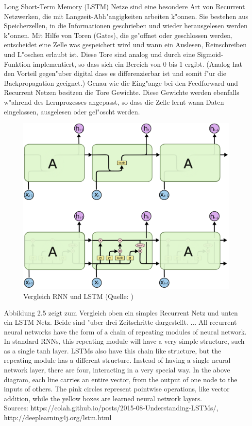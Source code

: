 {Long Short-Term Memory (LSTM) Netze sind eine besondere Art von Recurrent Netzwerken, die mit Langzeit-Abh"angigkeiten arbeiten k"onnen. Sie bestehen aus Speicherzellen, in die Informationen geschrieben und wieder herausgelesen werden k"onnen. Mit Hilfe von Toren (Gates), die ge"offnet oder geschlossen werden, entscheidet eine Zelle was gespeichert wird und wann ein Auslesen, Reinschreiben und L"oschen erlaubt ist. Diese Tore sind analog und durch eine Sigmoid-Funktion implementiert, so dass sich ein Bereich von 0 bis 1 ergibt. (Analog hat den Vorteil gegen"uber digital dass es differenzierbar ist und somit f"ur die Backpropagation geeignet.) Genau wie die Eing"ange bei den Feedforward und Recurrent Netzen besitzen die Tore Gewichte. Diese Gewichte werden ebenfalls w"ahrend des Lernprozesses angepasst, so dass die Zelle lernt wann Daten eingelassen, ausgelesen oder gel"oscht werden.
\renewcommand{\figurename}{Abb.}
\begin{figure}[h]
\centering
\includegraphics[width=1\textwidth]{pictures/SRN-LSTM-chain.png}
\caption[Vergleich RNN und LSTM]{Vergleich RNN und LSTM (Quelle: \cite{OlahImg})}
\end{figure}

Abbildung 2.5 zeigt zum Vergleich oben ein simples Recurrent Netz und unten ein LSTM Netz. Beide sind "uber drei Zeitschritte dargestellt. 
...
All recurrent neural networks have the form of a chain of repeating modules of neural network. In standard RNNs, this repeating module will have a very simple structure, such as a single tanh layer.
LSTMs also have this chain like structure, but the repeating module has a different structure. Instead of having a single neural network layer, there are four, interacting in a very special way.
In the above diagram, each line carries an entire vector, from the output of one node to the inputs of others. The pink circles represent pointwise operations, like vector addition, while the yellow boxes are learned neural network layers.
\\Sources: https://colah.github.io/posts/2015-08-Understanding-LSTMs/, http://deeplearning4j.org/lstm.html

}
